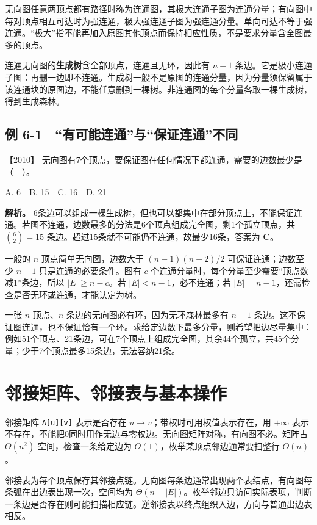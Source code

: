 无向图任意两顶点都有路径时称为连通图，其极大连通子图为连通分量；有向图中每对顶点相互可达时为强连通，极大强连通子图为强连通分量。单向可达不等于强连通。``极大''指不能再加入原图其他顶点而保持相应性质，不是要求分量含全图最多的顶点。

连通无向图的\textbf{生成树}含全部顶点，连通且无环，因此有 \(n-1\) 条边。它是极小连通子图：再删一边即不连通。生成树一般不是原图的连通分量，因为分量须保留属于该连通块的原图边，不能任意删到一棵树。非连通图的每个分量各取一棵生成树，得到生成森林。

\subsection{例 6-1　``有可能连通''与``保证连通''不同}\label{ds-ex6-1}

\noindent{}【2010】 无向图有7个顶点，要保证图在任何情况下都连通，需要的边数最少是（　）。

A. 6　B. 15　C. 16　D. 21


\textbf{解析。} 6条边可以组成一棵生成树，但也可以都集中在部分顶点上，不能保证连通。若图不连通，边数最多的分法是6个顶点组成完全图，剩1个孤立顶点，共 \(\binom62=15\) 条边。超过15条就不可能仍不连通，故最少16条，答案为 \textbf{C}。

一般的 \(n\) 顶点简单无向图，边数大于 \((n-1)(n-2)/2\) 可保证连通；边数至少 \(n-1\) 只是连通的必要条件。图有 \(c\) 个连通分量时，每个分量至少需要``顶点数减1''条边，所以 \(|E|\ge n-c\)。若 \(|E|<n-1\)，必不连通；若 \(|E|=n-1\)，还需检查是否无环或连通，才能认定为树。

一张 \(n\) 顶点、\(n\) 条边的无向图必有环，因为无环森林最多有 \(n-1\) 条边。这不保证图连通，也不保证恰有一个环。求给定边数下最多分量，则希望把边尽量集中：例如51个顶点、21条边，可在7个顶点上组成完全图，其余44个孤立，共45个分量；少于7个顶点最多15条边，无法容纳21条。

\section{邻接矩阵、邻接表与基本操作}\label{ds-06-02}

邻接矩阵 \texttt{A{[}u{]}{[}v{]}} 表示是否存在 \(u\to v\)；带权时可用权值表示存在，用 \(+\infty\) 表示不存在，不能把0同时用作无边与零权边。无向图矩阵对称，有向图不必。矩阵占 \(\Theta(n^2)\) 空间，检查一条给定边为 \(O(1)\)，枚举某顶点邻边通常要扫整行 \(O(n)\)。

邻接表为每个顶点保存其邻接点链。无向图每条边通常出现两个表结点，有向图每条弧在出边表出现一次，空间均为 \(\Theta(n+|E|)\)。枚举邻边只访问实际表项，判断一条边是否存在则可能扫描相应链。逆邻接表以终点组织入边，方向与普通出边表相反。

